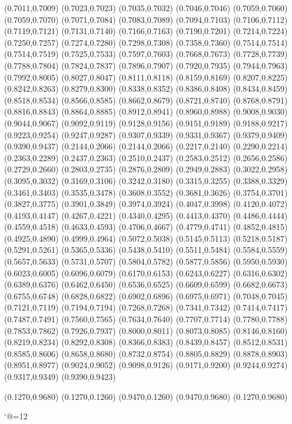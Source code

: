 \PST@Diamond(0.7011,0.7009)
\PST@Diamond(0.7023,0.7023)
\PST@Diamond(0.7035,0.7032)
\PST@Diamond(0.7046,0.7046)
\PST@Diamond(0.7059,0.7060)
\PST@Diamond(0.7059,0.7070)
\PST@Diamond(0.7071,0.7084)
\PST@Diamond(0.7083,0.7089)
\PST@Diamond(0.7094,0.7103)
\PST@Diamond(0.7106,0.7112)
\PST@Diamond(0.7119,0.7121)
\PST@Diamond(0.7131,0.7140)
\PST@Diamond(0.7166,0.7163)
\PST@Diamond(0.7190,0.7201)
\PST@Diamond(0.7214,0.7224)
\PST@Diamond(0.7250,0.7257)
\PST@Diamond(0.7274,0.7280)
\PST@Diamond(0.7298,0.7308)
\PST@Diamond(0.7358,0.7360)
\PST@Diamond(0.7514,0.7514)
\PST@Diamond(0.7514,0.7519)
\PST@Diamond(0.7525,0.7533)
\PST@Diamond(0.7597,0.7603)
\PST@Diamond(0.7668,0.7673)
\PST@Diamond(0.7728,0.7739)
\PST@Diamond(0.7788,0.7804)
\PST@Diamond(0.7824,0.7837)
\PST@Diamond(0.7896,0.7907)
\PST@Diamond(0.7920,0.7935)
\PST@Diamond(0.7944,0.7963)
\PST@Diamond(0.7992,0.8005)
\PST@Diamond(0.8027,0.8047)
\PST@Diamond(0.8111,0.8118)
\PST@Diamond(0.8159,0.8169)
\PST@Diamond(0.8207,0.8225)
\PST@Diamond(0.8242,0.8263)
\PST@Diamond(0.8279,0.8300)
\PST@Diamond(0.8338,0.8352)
\PST@Diamond(0.8386,0.8408)
\PST@Diamond(0.8434,0.8459)
\PST@Diamond(0.8518,0.8534)
\PST@Diamond(0.8566,0.8585)
\PST@Diamond(0.8662,0.8679)
\PST@Diamond(0.8721,0.8740)
\PST@Diamond(0.8768,0.8791)
\PST@Diamond(0.8816,0.8843)
\PST@Diamond(0.8864,0.8885)
\PST@Diamond(0.8912,0.8941)
\PST@Diamond(0.8960,0.8988)
\PST@Diamond(0.9008,0.9030)
\PST@Diamond(0.9044,0.9067)
\PST@Diamond(0.9092,0.9119)
\PST@Diamond(0.9128,0.9156)
\PST@Diamond(0.9151,0.9189)
\PST@Diamond(0.9188,0.9217)
\PST@Diamond(0.9223,0.9254)
\PST@Diamond(0.9247,0.9287)
\PST@Diamond(0.9307,0.9339)
\PST@Diamond(0.9331,0.9367)
\PST@Diamond(0.9379,0.9409)
\PST@Diamond(0.9390,0.9437)
\PST@Dashed(0.2144,0.2066)
(0.2144,0.2066)
(0.2217,0.2140)
(0.2290,0.2214)
(0.2363,0.2289)
(0.2437,0.2363)
(0.2510,0.2437)
(0.2583,0.2512)
(0.2656,0.2586)
(0.2729,0.2660)
(0.2803,0.2735)
(0.2876,0.2809)
(0.2949,0.2883)
(0.3022,0.2958)
(0.3095,0.3032)
(0.3169,0.3106)
(0.3242,0.3180)
(0.3315,0.3255)
(0.3388,0.3329)
(0.3461,0.3403)
(0.3535,0.3478)
(0.3608,0.3552)
(0.3681,0.3626)
(0.3754,0.3701)
(0.3827,0.3775)
(0.3901,0.3849)
(0.3974,0.3924)
(0.4047,0.3998)
(0.4120,0.4072)
(0.4193,0.4147)
(0.4267,0.4221)
(0.4340,0.4295)
(0.4413,0.4370)
(0.4486,0.4444)
(0.4559,0.4518)
(0.4633,0.4593)
(0.4706,0.4667)
(0.4779,0.4741)
(0.4852,0.4815)
(0.4925,0.4890)
(0.4999,0.4964)
(0.5072,0.5038)
(0.5145,0.5113)
(0.5218,0.5187)
(0.5291,0.5261)
(0.5365,0.5336)
(0.5438,0.5410)
(0.5511,0.5484)
(0.5584,0.5559)
(0.5657,0.5633)
(0.5731,0.5707)
(0.5804,0.5782)
(0.5877,0.5856)
(0.5950,0.5930)
(0.6023,0.6005)
(0.6096,0.6079)
(0.6170,0.6153)
(0.6243,0.6227)
(0.6316,0.6302)
(0.6389,0.6376)
(0.6462,0.6450)
(0.6536,0.6525)
(0.6609,0.6599)
(0.6682,0.6673)
(0.6755,0.6748)
(0.6828,0.6822)
(0.6902,0.6896)
(0.6975,0.6971)
(0.7048,0.7045)
(0.7121,0.7119)
(0.7194,0.7194)
(0.7268,0.7268)
(0.7341,0.7342)
(0.7414,0.7417)
(0.7487,0.7491)
(0.7560,0.7565)
(0.7634,0.7640)
(0.7707,0.7714)
(0.7780,0.7788)
(0.7853,0.7862)
(0.7926,0.7937)
(0.8000,0.8011)
(0.8073,0.8085)
(0.8146,0.8160)
(0.8219,0.8234)
(0.8292,0.8308)
(0.8366,0.8383)
(0.8439,0.8457)
(0.8512,0.8531)
(0.8585,0.8606)
(0.8658,0.8680)
(0.8732,0.8754)
(0.8805,0.8829)
(0.8878,0.8903)
(0.8951,0.8977)
(0.9024,0.9052)
(0.9098,0.9126)
(0.9171,0.9200)
(0.9244,0.9274)
(0.9317,0.9349)
(0.9390,0.9423)

\PST@Border(0.1270,0.9680)
(0.1270,0.1260)
(0.9470,0.1260)
(0.9470,0.9680)
(0.1270,0.9680)

\catcode`@=12
\fi
\endpspicture
